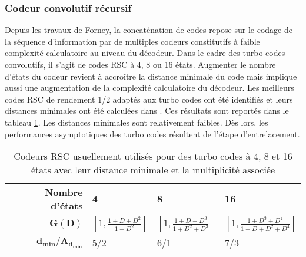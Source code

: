 \subsubsection{Codeur convolutif récursif}
Depuis les travaux de Forney, la concaténation de codes repose sur le codage de la séquence d'information par de multiples codeurs 
constitutifs à faible complexité calculatoire au niveau du décodeur. Dans le cadre des turbo codes convolutifs, il s'agit de codes RSC à 4, 8 ou 16 états.
Augmenter le nombre d'états du codeur revient à accroître la distance minimale du code mais implique aussi une augmentation 
de la complexité calculatoire du décodeur. Les meilleurs codes RSC de rendement 1/2 adaptés aux turbo codes ont été identifiés 
et leurs distances minimales ont été calculées dans \cite{RSCdist}. Ces résultats sont reportés dans le tableau \ref{tab:bestRSC}. 
Les distances minimales sont relativement faibles. Dès lors, les performances asymptotiques des turbo codes résultent de l'étape 
d'entrelacement. 

\begin{table}[h]
	\centering
	\renewcommand{\arraystretch}{1.4}
	\begin{tabular}{rlll}
		\toprule
		\textbf{Nombre d'états}       & $\mathbf{4}$                           & $\mathbf{8}$                               & $\mathbf{16}$                                  \\ 
		\cmidrule(l){2-2} \cmidrule(l){3-3} \cmidrule(l){4-4}
		$\mathbf{G(D)}$                & $\left[1,\frac{1+D+D^2}{1+D^2}\right]$ & $\left[1,\frac{1+D+D^3}{1+D^2+D^3}\right]$ & $\left[1,\frac{1+D^3+D^4}{1+D+D^2+D^4}\right]$ \\
		$\mathbf{d_{min}/A_{d_{min}}}$ & 5/2                                    & 6/1                                        & 7/3                                            \\ \bottomrule
	\end{tabular}
	\caption{Codeurs RSC usuellement utilisés pour des turbo codes à 4, 8 et 16 états avec leur distance minimale et la multiplicité associée}
	\label{tab:bestRSC}
\end{table}

